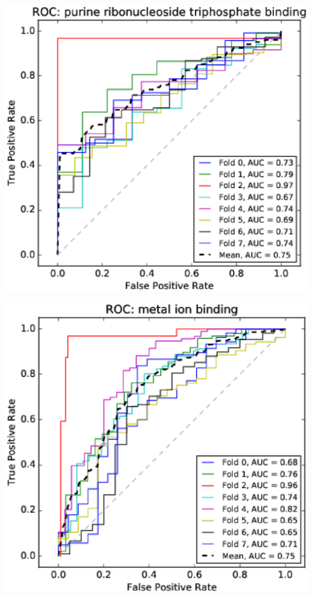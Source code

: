 \documentclass[11pt,twoside,a4paper]{book}
\newenvironment{Figure}
  {\par\medskip\noindent\minipage{\linewidth}}
  {\endminipage\par\medskip}
\begin{document}
\begin{multicols}{2}
\begin{Figure}\begin{center}\includegraphics[width=\linewidth]{figures/roc_purine_ribonucleoside_triphosphate_binding}\label{fig:roc_purine_ribonucleoside_triphosphate_binding}\end{center}\end{Figure}
\begin{Figure}\begin{center}\includegraphics[width=\linewidth]{figures/roc_metal_ion_binding}\label{fig:roc_metal_ion_binding}\end{center}\end{Figure}

\end{multicols}
\end{document}
